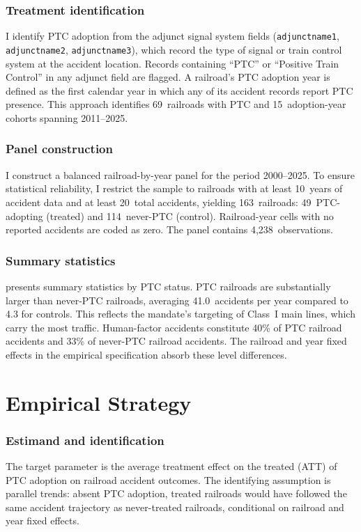 \documentclass[12pt]{article}
\begin{document}
\subsubsection*{Treatment identification} I identify PTC adoption from the adjunct signal system fields (\texttt{adjunctname1}, \texttt{adjunctname2}, \texttt{adjunctname3}), which record the type of signal or train control system at the accident location. Records containing ``PTC'' or ``Positive Train Control'' in any adjunct field are flagged. A railroad's PTC adoption year is defined as the first calendar year in which any of its accident records report PTC presence. This approach identifies 69~railroads with PTC and 15~adoption-year cohorts spanning 2011--2025.

\subsubsection*{Panel construction} I construct a balanced railroad-by-year panel for the period 2000--2025. To ensure statistical reliability, I restrict the sample to railroads with at least 10~years of accident data and at least 20~total accidents, yielding 163~railroads: 49~PTC-adopting (treated) and 114~never-PTC (control). Railroad-year cells with no reported accidents are coded as zero. The panel contains 4,238~observations.

\subsubsection*{Summary statistics}  presents summary statistics by PTC status. PTC railroads are substantially larger than never-PTC railroads, averaging 41.0~accidents per year compared to 4.3 for controls. This reflects the mandate's targeting of Class~I main lines, which carry the most traffic. Human-factor accidents constitute 40\% of PTC railroad accidents and 33\% of never-PTC railroad accidents. The railroad and year fixed effects in the empirical specification absorb these level differences.




\section{Empirical Strategy}
\label{sec:strategy}

\subsubsection*{Estimand and identification} The target parameter is the average treatment effect on the treated (ATT) of PTC adoption on railroad accident outcomes. The identifying assumption is parallel trends: absent PTC adoption, treated railroads would have followed the same accident trajectory as never-treated railroads, conditional on railroad and year fixed effects.
\end{document}
